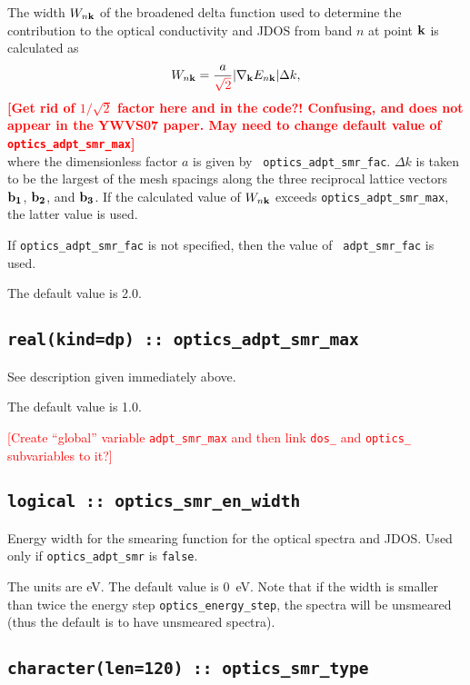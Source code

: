 The width $W_{n{\bf k}}$ of the broadened delta function used to
determine the contribution to the optical conductivity and JDOS from
band $n$ at point ${\bf k}$ is calculated as
%
$$
W_{n{\bf k}}=\frac{a}{\textcolor{red}{\sqrt{2}}}\vert
\nabla_{\bf k} E_{n{\bf k}}\vert \Delta k,
$$ 
%
\textcolor{red}{{\bf [Get rid of $1/\sqrt{2}$ factor here and in the code?! 
Confusing, and does not appear in the YWVS07 paper. May need to change default value of
{\tt optics\_adpt\_smr\_max}]}}\\
where the dimensionless factor $a$ is given by {\tt
  optics\_adpt\_smr\_fac}. $\Delta k$ is taken to be the largest of
the mesh spacings along the three reciprocal lattice vectors ${\bf
  b_1}$, ${\bf b_2}$, and ${\bf b_3}$.  If the calculated value of
$W_{n{\bf k}}$ exceeds {\tt optics\_adpt\_smr\_max}, the latter
value is used.

If {\tt optics\_adpt\_smr\_fac} is not specified, then the value of {\tt
  adpt\_smr\_fac} is used.  

The default value is 2.0.


\subsection[optics\_adpt\_smr\_max]{\tt real(kind=dp) ::
  optics\_adpt\_smr\_max}

See description given immediately above.

The default value is 1.0.

\textcolor{red}{[Create ``global'' variable {\tt adpt\_smr\_max} and then link
{\tt dos\_} and {\tt optics\_} subvariables to it?]}

\subsection[optics\_smr\_en\_width]{\tt logical :: optics\_smr\_en\_width}
Energy width for the smearing function for the optical spectra
and JDOS. Used only if {\tt optics\_adpt\_smr} is \verb#false#.

The units are eV. The default value is 0~eV. Note that if the width is
smaller than twice the energy step {\tt optics\_energy\_step}, the spectra
will be unsmeared (thus the default is to have unsmeared spectra).


\subsection[optics\_smr\_type]{\tt  character(len=120) :: optics\_smr\_type}

